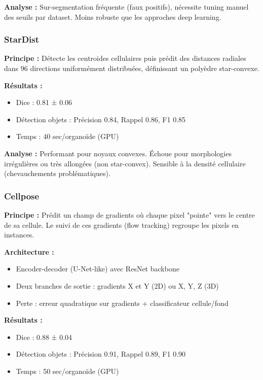 \textbf{Analyse :}
Sur-segmentation fréquente (faux positifs), nécessite tuning manuel des seuils par dataset. Moins robuste que les approches deep learning.

\subsubsection{StarDist}

\textbf{Principe :}
Détecte les centroides cellulaires puis prédit des distances radiales dans 96 directions uniformément distribuées, définissant un polyèdre star-convexe.

\textbf{Résultats :}
\begin{itemize}
    \item Dice : 0.81 ± 0.06
    \item Détection objets : Précision 0.84, Rappel 0.86, F1 0.85
    \item Temps : 40 sec/organoïde (GPU)
\end{itemize}

\textbf{Analyse :}
Performant pour noyaux convexes. Échoue pour morphologies irrégulières ou très allongées (non star-convex). Sensible à la densité cellulaire (chevauchements problématiques).

\subsubsection{Cellpose}

\textbf{Principe :}
Prédit un champ de gradients où chaque pixel "pointe" vers le centre de sa cellule. Le suivi de ces gradients (flow tracking) regroupe les pixels en instances.

\textbf{Architecture :}
\begin{itemize}
    \item Encoder-decoder (U-Net-like) avec ResNet backbone
    \item Deux branches de sortie : gradients X et Y (2D) ou X, Y, Z (3D)
    \item Perte : erreur quadratique sur gradients + classificateur cellule/fond
\end{itemize}

\textbf{Résultats :}
\begin{itemize}
    \item Dice : 0.88 ± 0.04
    \item Détection objets : Précision 0.91, Rappel 0.89, F1 0.90
    \item Temps : 50 sec/organoïde (GPU)
\end{itemize}

